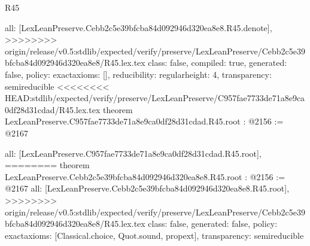 \begin{lexlean}{R45}
\begin{coremodule}
{{{{{{{{{  all: [LexLeanPreserve.Cebb2c5e39bfcba84d092946d320ea8e8.R45.denote],
>>>>>>>> origin/release/v0.5:stdlib/expected/verify/preserve/LexLeanPreserve/Cebb2c5e39bfcba84d092946d320ea8e8/R45.lex.tex
  class: false,
  compiled: true,
  generated: false,
  policy: exact{axioms: []},
  reducibility: regular{height: 4},
  transparency: semireducible
}
<<<<<<<< HEAD:stdlib/expected/verify/preserve/LexLeanPreserve/C957fae7733de71a8e9ca0df28d31cdad/R45.lex.tex
theorem LexLeanPreserve.C957fae7733de71a8e9ca0df28d31cdad.R45.root : @2156 := @2167 {
  all: [LexLeanPreserve.C957fae7733de71a8e9ca0df28d31cdad.R45.root],
========
theorem LexLeanPreserve.Cebb2c5e39bfcba84d092946d320ea8e8.R45.root : @2156 := @2167 {
  all: [LexLeanPreserve.Cebb2c5e39bfcba84d092946d320ea8e8.R45.root],
>>>>>>>> origin/release/v0.5:stdlib/expected/verify/preserve/LexLeanPreserve/Cebb2c5e39bfcba84d092946d320ea8e8/R45.lex.tex
  class: false,
  generated: false,
  policy: exact{axioms: [Classical.choice, Quot.sound, propext]},
  transparency: semireducible
}

}}}}}}}}}
\end{coremodule}
\end{lexlean}
